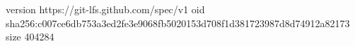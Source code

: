 version https://git-lfs.github.com/spec/v1
oid sha256:c007ce6db753a3ed2fe3e9068fb5020153d708f1d381723987d8d74912a82173
size 404284

